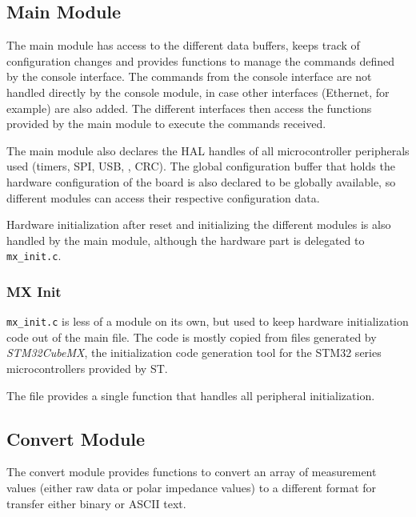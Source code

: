 \subsection{Main Module}

The main module has access to the different data buffers, keeps track of configuration changes and provides functions
to manage the commands defined by the console interface. The commands from the console interface are not handled
directly by the console module, in case other interfaces (Ethernet, for example) are also added. The different
interfaces then access the functions provided by the main module to execute the commands received.

The main module also declares the HAL handles of all microcontroller peripherals used (timers, SPI, USB, \iic{}, CRC).
The global configuration buffer that holds the hardware configuration of the board is also declared to be globally
available, so different modules can access their respective configuration data.

Hardware initialization after reset and initializing the different modules is also handled by the main module, although
the hardware part is delegated to \verb!mx_init.c!.

\subsubsection{MX Init}

\verb!mx_init.c! is less of a module on its own, but used to keep hardware initialization code out of the main file.
The code is mostly copied from files generated by \emph{STM32CubeMX}, the initialization code generation tool for the
STM32 series microcontrollers provided by ST.

The file provides a single function that handles all peripheral initialization.


\subsection{Convert Module}

The convert module provides functions to convert an array of measurement values (either raw data or polar
impedance values) to a different format for transfer either binary or ASCII text.

